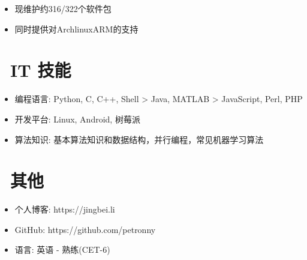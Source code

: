 \documentclass{resume}
\begin{document}
\begin{itemize}
	\item 现维护约316/322个软件包
	\item 同时提供对ArchlinuxARM的支持
\end{itemize}


\section{\faCogs\ IT 技能}
\begin{itemize}[parsep=0.5ex]
	\item 编程语言: Python, C, C++, Shell > Java, MATLAB >  JavaScript, Perl, PHP
	\item 开发平台: Linux, Android, 树莓派
	\item 算法知识: 基本算法知识和数据结构，并行编程，常见机器学习算法
\end{itemize}


\section{\faInfo\ 其他}
\begin{itemize}[parsep=0.5ex]
	\item 个人博客: https://jingbei.li
	\item GitHub: https://github.com/petronny
	\item 语言: 英语 - 熟练(CET-6)
\end{itemize}

%
%
\end{document}
